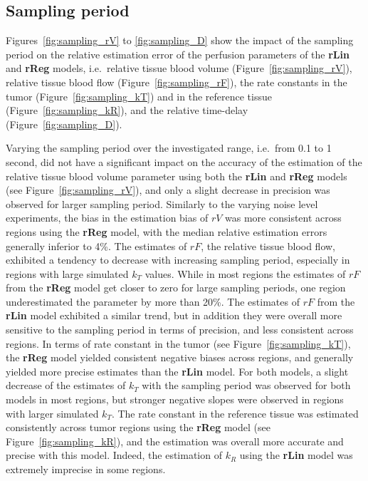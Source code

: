 \subsection{Sampling period}
Figures~\ref{fig:sampling_rV} to \ref{fig:sampling_D} show the impact of the sampling period on the relative estimation error of the perfusion parameters of the \textbf{rLin} and \textbf{rReg} models, i.e.~relative tissue blood volume (Figure~\ref{fig:sampling_rV}), relative tissue blood flow (Figure~\ref{fig:sampling_rF}), the rate constants in the tumor (Figure~\ref{fig:sampling_kT}) and in the reference tissue (Figure~\ref{fig:sampling_kR}), and the relative time-delay (Figure~\ref{fig:sampling_D}).

Varying the sampling period over the investigated range, i.e.~from 0.1 to 1 second, did not have a significant impact on the accuracy of the estimation of the relative tissue blood volume parameter using both the \textbf{rLin} and \textbf{rReg} models (see Figure~\ref{fig:sampling_rV}), and only a slight decrease in precision was observed for larger sampling period.
Similarly to the varying noise level experiments, the bias in the estimation bias of $rV$ was more consistent across regions using the \textbf{rReg} model, with the median relative estimation errors generally inferior to 4\%.
The estimates of $rF$, the relative tissue blood flow, exhibited a tendency to decrease with increasing sampling period, especially in regions with large simulated $k_T$ values. 
While in most regions the estimates of $rF$ from the \textbf{rReg} model get closer to zero for large sampling periods, one region underestimated the parameter by more than 20\%.
The estimates of $rF$ from the \textbf{rLin} model exhibited a similar trend, but in addition they were overall more sensitive to the sampling period in terms of precision, and less consistent across regions.
In terms of rate constant in the tumor (see Figure~\ref{fig:sampling_kT}), the \textbf{rReg} model yielded consistent negative biases across regions, and generally yielded more precise estimates than the \textbf{rLin} model.
For both models, a slight decrease of the estimates of $k_T$ with the sampling period was observed for both models in most regions, but stronger negative slopes were observed in regions with larger simulated $k_T$.
The rate constant in the reference tissue was estimated consistently across tumor regions using the \textbf{rReg} model (see Figure~\ref{fig:sampling_kR}), and the estimation was overall more accurate and precise with this model.
Indeed, the estimation of $k_R$ using the \textbf{rLin} model was extremely imprecise in some regions.

